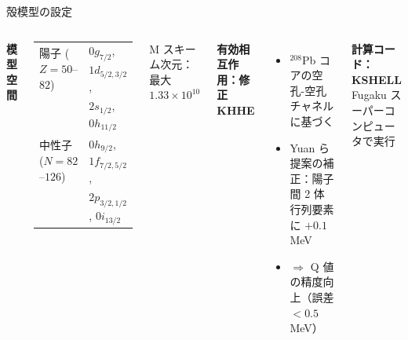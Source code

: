 \documentclass[aspectratio=169,12pt]{beamer}
\begin{document}
\begin{frame}{殻模型の設定}
  \begin{columns}
    \textbf{模型空間}
    \begin{center}
    \begin{tabular}{ll}
      \toprule
      陽子 ($Z=50$--$82$) & $0g_{7/2}$, $1d_{5/2,3/2}$,\\
                          & $2s_{1/2}$, $0h_{11/2}$ \\
      \midrule
      中性子 ($N=82$--$126$) & $0h_{9/2}$, $1f_{7/2,5/2}$,\\
                             & $2p_{3/2,1/2}$, $0i_{13/2}$ \\
      \bottomrule
    \end{tabular}
    \end{center}
    M スキーム次元：最大 $1.33 \times 10^{10}$

    \textbf{有効相互作用：修正 KHHE}
    \begin{itemize}
      \item $^{208}$Pb コアの空孔-空孔チャネルに基づく
      \item Yuan ら提案の補正：陽子間 2 体行列要素に $+0.1$ MeV
      \item $\Rightarrow$ Q 値の精度向上（誤差 $<0.5$ MeV）
    \end{itemize}
    \vspace{0.3em}
    \textbf{計算コード：KSHELL}\\
    Fugaku スーパーコンピュータで実行
  \end{columns}
\end{frame}
\end{document}
